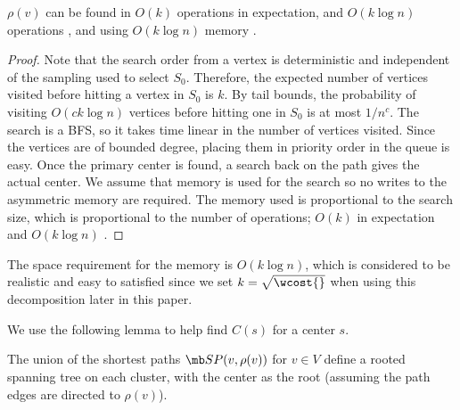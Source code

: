 \begin{lemma}
\label{lemma:findcenter}
$\rho(v)$ can be found in $O(k)$ operations in expectation, and
$O(k \log n)$ operations \whp{}, and using
$O(k \log n)$ \local{} memory \whp{}.
\end{lemma}
\begin{proof}
Note that the search order from a vertex is deterministic and
independent of the
sampling used to select $S_0$.
Therefore, the expected number of vertices visited before hitting a
vertex in $S_0$ is $k$.  By tail bounds, the probability
of visiting $O(c k \log n)$ vertices before hitting one in $S_0$ is
at most $1/n^c$.  The search is a BFS, so it takes time linear
in the number of vertices visited.  Since the vertices are of bounded
degree, placing them in priority order in the queue is easy.  Once the
primary center is found, a search back on the path gives the actual center.
We assume that \local{} memory is
used for the search so no writes to the asymmetric memory are
required.  The memory used is proportional to the search size, which
is proportional to the number of operations; $O(k)$ in expectation and $O(k
\log n)$ \whp{}.
\end{proof}

The space requirement for the \local{} memory is $O(k \log n)$, which is considered to be realistic and easy to satisfied since we set $k=\sqrt{\wcost{}}$ when using this decomposition later in this paper.

We use the following lemma to help find $C(s)$ for a center $s$.

\begin{lemma}
	\label{lemma:clustertree}
	The union of the shortest paths $\p(v,\rho(v))$ for $v \in V$
        define a rooted spanning tree on each cluster, with the center
        as the root (assuming the path edges are directed to $\rho(v)$).
\end{lemma}

